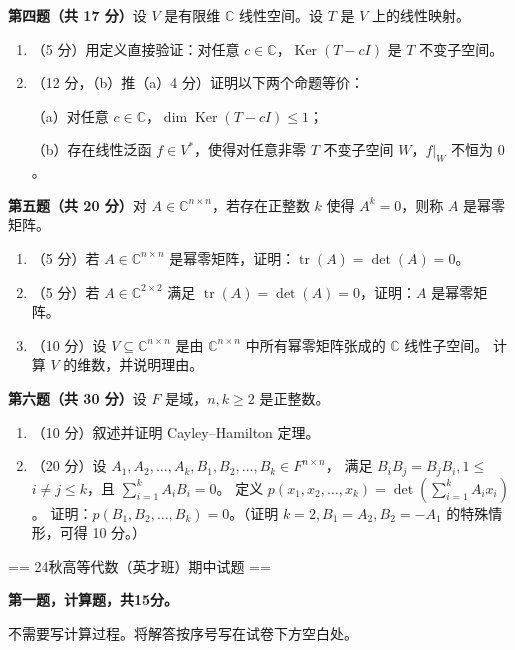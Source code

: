 \textbf{第四题（共 17 分）}设 $V$ 是有限维 $\mathbb{C}$ 线性空间。设 $T$ 是 $V$ 上的线性映射。
\begin{enumerate}
\item（5 分）用定义直接验证：对任意 $c \in \mathbb{C}$，$\operatorname{Ker}(T-cI)$ 是 $T$ 不变子空间。
\item（12 分，（b）推（a）4 分）证明以下两个命题等价：

（a）对任意 $c \in \mathbb{C}$，$\dim \operatorname{Ker}(T-cI) \leq 1$；

（b）存在线性泛函 $f \in V^{*}$，使得对任意非零 $T$ 不变子空间 $W$，$f|_{W}$ 不恒为 $0$。
\end{enumerate}

\textbf{第五题（共 20 分）}对 $A \in \mathbb{C}^{n \times n}$，若存在正整数 $k$ 使得 $A^{k}=0$，则称 $A$ 是幂零矩阵。
\begin{enumerate}
\item（5 分）若 $A \in \mathbb{C}^{n \times n}$ 是幂零矩阵，证明：$\operatorname{tr}(A)=\det(A)=0$。
\item（5 分）若 $A \in \mathbb{C}^{2 \times 2}$ 满足 $\operatorname{tr}(A)=\det(A)=0$，证明：$A$ 是幂零矩阵。
\item（10 分）设 $V \subseteq \mathbb{C}^{n \times n}$ 是由 $\mathbb{C}^{n \times n}$ 中所有幂零矩阵张成的 $\mathbb{C}$ 线性子空间。
计算 $V$ 的维数，并说明理由。
\end{enumerate}

\textbf{第六题（共 30 分）}设 $F$ 是域，$n, k \geq 2$ 是正整数。
\begin{enumerate}
\item（10 分）叙述并证明 Cayley--Hamilton 定理。
\item（20 分）设 $A_{1}, A_{2}, \ldots, A_{k}, B_{1}, B_{2}, \ldots, B_{k} \in F^{n \times n}$，
满足 $B_{i} B_{j}=B_{j} B_{i}, 1 \leq$ $i \neq j \leq k$，且 $\sum_{i=1}^{k} A_{i} B_{i}=0$。
定义 $p(x_{1}, x_{2}, \ldots, x_{k})=\det\left(\sum_{i=1}^{k} A_{i} x_{i}\right)$。
证明：$p(B_{1}, B_{2}, \ldots, B_{k})=0$。（证明 $k=2, B_{1}=A_{2}, B_{2}=-A_{1}$ 的特殊情形，可得 10 分。）
\end{enumerate}

== 24秋高等代数（英才班）期中试题 ==

    \textbf{第一题，计算题，共15分。}
    
    不需要写计算过程。将解答按序号写在试卷下方空白处。

